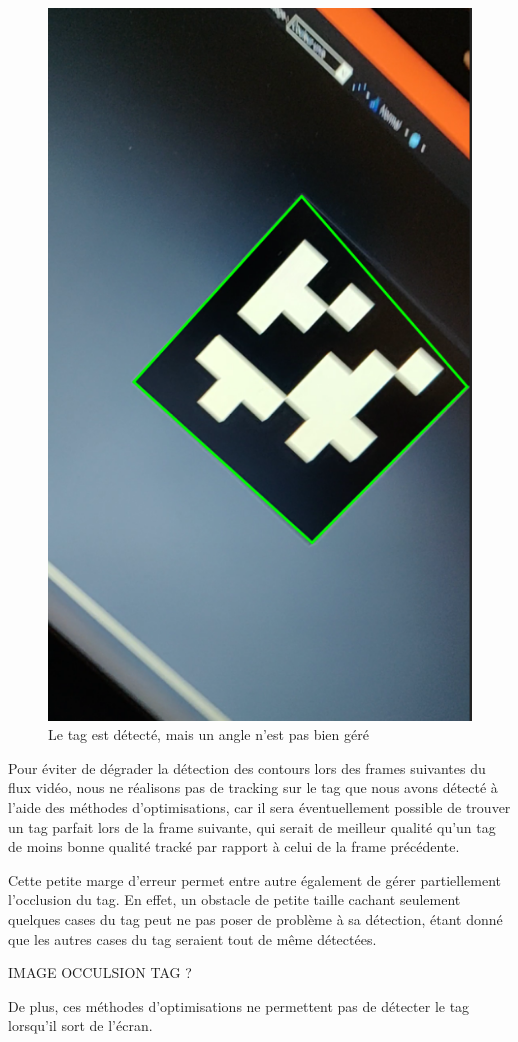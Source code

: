         \begin{figure}[!h]
            \centering
            \includegraphics[scale=0.25]{img/cropped_tag.png}
            \caption{Le tag est détecté, mais un angle n'est pas bien géré}
        \end{figure}

        Pour éviter de dégrader la détection des contours lors des frames suivantes du flux vidéo, nous ne réalisons pas de tracking sur le tag que nous avons détecté à l'aide des méthodes d'optimisations, car il sera éventuellement possible de trouver un tag parfait lors de la frame suivante, qui serait de meilleur qualité qu'un tag de moins bonne qualité tracké par rapport à celui de la frame précédente.

        Cette petite marge d'erreur permet entre autre également de gérer partiellement l'occlusion du tag. En effet, un obstacle de petite taille cachant seulement quelques cases du tag peut ne pas poser de problème à sa détection, étant donné que les autres cases du tag seraient tout de même détectées.

        IMAGE OCCULSION TAG ? 

        De plus, ces méthodes d'optimisations ne permettent pas de détecter le tag lorsqu'il sort de l'écran.